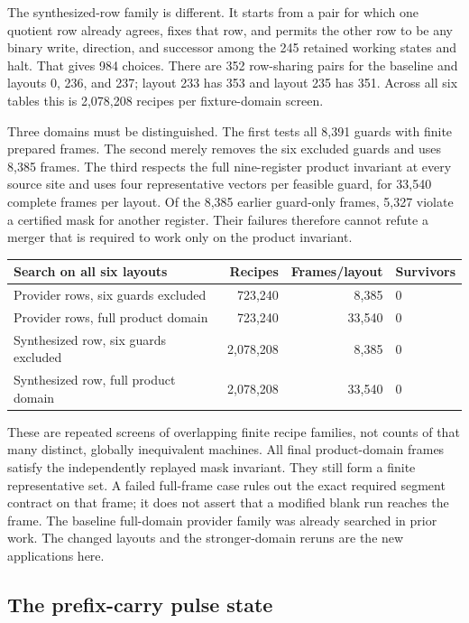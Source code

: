 The synthesized-row family is different. It starts from a pair for
which one quotient row already agrees, fixes that row, and permits the
other row to be any binary write, direction, and successor among the
245 retained working states and halt. That gives 984 choices. There
are 352 row-sharing pairs for the baseline and layouts 0, 236, and 237;
layout 233 has 353 and layout 235 has 351. Across all six tables this
is 2,078,208 recipes per fixture-domain screen.

Three domains must be distinguished. The first tests all 8,391 guards
with finite prepared frames. The second merely removes the six excluded
guards and uses 8,385 frames. The third respects the full nine-register
product invariant at every source site and uses four representative
vectors per feasible guard, for 33,540 complete frames per layout.
Of the 8,385 earlier guard-only frames, 5,327 violate a certified mask
for another register. Their failures therefore cannot refute a merger
that is required to work only on the product invariant.

\begin{center}
\begin{tabular}{p{53mm}rrp{35mm}}
\toprule
Search on all six layouts & Recipes & Frames/layout & Survivors\\
\midrule
Provider rows, six guards excluded &723,240&8,385&0\\
Provider rows, full product domain &723,240&33,540&0\\
Synthesized row, six guards excluded &2,078,208&8,385&0\\
Synthesized row, full product domain &2,078,208&33,540&0\\
\bottomrule
\end{tabular}
\end{center}

These are repeated screens of overlapping finite recipe families,
not counts of that many distinct, globally inequivalent machines.
All final product-domain frames satisfy the independently replayed
mask invariant. They still form a finite representative set. A failed
full-frame case rules out the exact required segment contract on that
frame; it does not assert that a modified blank run reaches the frame.
The baseline full-domain provider family was already searched in prior
work. The changed layouts and the stronger-domain reruns are the new
applications here.

\subsection{The prefix-carry pulse state}

